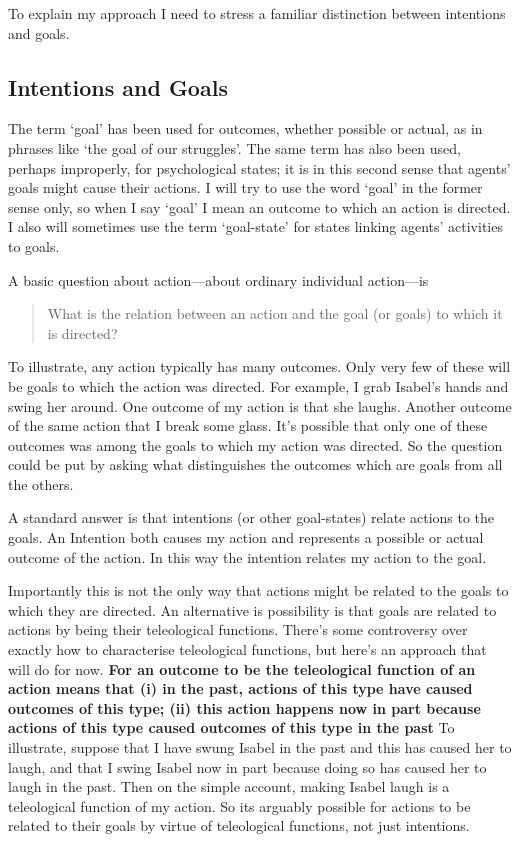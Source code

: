\documentclass[12pt,a4paper]{extarticle}
\begin{document}
To explain my approach I need to stress a familiar distinction between intentions and goals.


\subsection{Intentions and Goals}
The term `goal' has been used for outcomes, whether possible or actual, as in phrases like `the goal of our struggles'.  The same term has also been used, perhaps improperly, for psychological states; it is in this second sense that agents' goals might cause their actions.  I will try to use the word `goal' in the former sense only, so when I say `goal' I mean an outcome to which an action is directed.   I also will sometimes use the term `goal-state' for states linking agents' activities to goals.

A basic question about action---about ordinary individual action---is
%
\begin{quote}
What is the relation between an action and the goal (or goals) to which it is directed?
\end{quote}
%
To illustrate, any action typically has many outcomes.
Only very few of these will be goals to which the action was directed.
For example, I grab Isabel's hands and swing her around.
One outcome of my action is that she laughs.
Another outcome of the same action that I break some glass.
It's possible that only one of these outcomes was among the goals to which my action was directed.
So the question could be put by asking what distinguishes the outcomes which are goals from all the others.

A standard answer is that intentions (or other goal-states) relate actions to the goals.
An Intention both causes my action and represents a possible or actual outcome of the action.
In this way the intention relates my action to the goal.

Importantly this is not the only way that actions might be related to the goals to which they are directed.
An alternative is possibility is that goals are related to actions by being their teleological functions.
There's some controversy over exactly how to characterise teleological functions, but here's an approach that will do for now.
\textbf{
For an outcome to be the teleological function of an action means that (i) in the past, actions of this type have caused outcomes of this type; (ii) this action happens now in part because actions of this type caused outcomes of this type in the past
}
To illustrate, suppose that I have swung Isabel in the past and this has caused her to laugh, and that I  swing Isabel now in part because doing so has caused her to laugh in the past.
Then on the simple account, making Isabel laugh is a teleological function of my action.
So its arguably possible for actions to be related to their goals by virtue of teleological functions, not just intentions.
\end{document}
